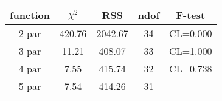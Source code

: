 \begin{tabular}{c|c|c|c|c}
function & $\chi^2$ & RSS & ndof & F-test \\
\hline
2 par & 420.76 & 2042.67 & 34 & CL=0.000 \\
3 par & 11.21 & 408.07 & 33 & CL=1.000 \\
4 par & 7.55 & 415.74 & 32 & CL=0.738 \\
5 par & 7.54 & 414.26 & 31 & \\
\hline
\end{tabular}